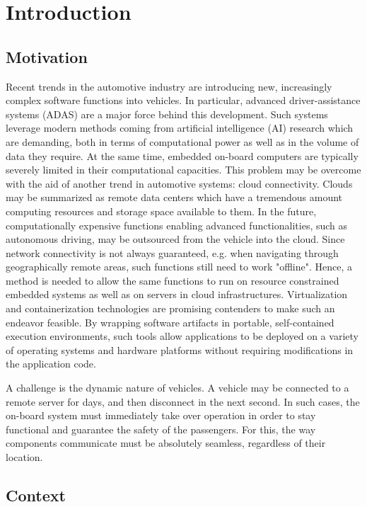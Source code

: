 
\chapter{Introduction}\label{chapter:introduction}


\section{Motivation}
Recent trends in the automotive industry are introducing new, increasingly complex software functions into vehicles. In particular, advanced driver-assistance systems (ADAS) are a major force behind this development. Such systems leverage modern methods coming from artificial intelligence (AI) research which are demanding, both in terms of computational power as well as in the volume of data they require. At the same time, embedded on-board computers are typically severely limited in their computational capacities. This problem may be overcome with the aid of another trend in automotive systems: cloud connectivity. Clouds may be summarized as remote data centers which have a tremendous amount computing resources and storage space available to them. In the future, computationally expensive functions enabling advanced functionalities, such as autonomous driving, may be outsourced from the vehicle into the cloud. Since network connectivity is not always guaranteed, e.g. when navigating through geographically remote areas, such functions still need to work "offline". Hence, a method is needed to allow the same functions to run on resource constrained embedded systems as well as on servers in cloud infrastructures. Virtualization and containerization technologies are promising contenders to make such an endeavor feasible. By wrapping software artifacts in portable, self-contained execution environments, such tools allow applications to be deployed on a variety of operating systems and hardware platforms without requiring modifications in the application code. 

A challenge is the dynamic nature of vehicles. A vehicle may be connected to a remote server for days, and then disconnect in the next second. In such cases, the on-board system must immediately take over operation in order to stay functional and guarantee the safety of the passengers. For this, the way components communicate must be absolutely seamless, regardless of their location.

%
%
%
%
%
%
%
%
%
%

\section{Context}

